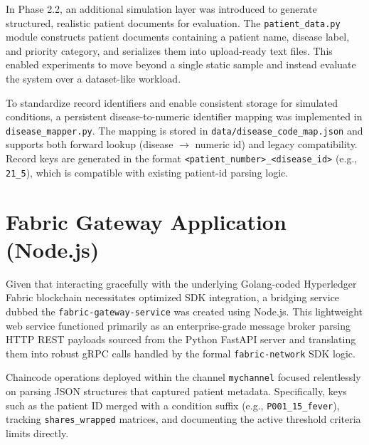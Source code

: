 In Phase 2.2, an additional simulation layer was introduced to generate structured, realistic patient documents for evaluation. The \texttt{patient\_data.py} module constructs patient documents containing a patient name, disease label, and priority category, and serializes them into upload-ready text files. This enabled experiments to move beyond a single static sample and instead evaluate the system over a dataset-like workload.

To standardize record identifiers and enable consistent storage for simulated conditions, a persistent disease-to-numeric identifier mapping was implemented in \texttt{disease\_mapper.py}. The mapping is stored in \texttt{data/disease\_code\_map.json} and supports both forward lookup (disease $\rightarrow$ numeric id) and legacy compatibility. Record keys are generated in the format \texttt{<patient\_number>\_<disease\_id>} (e.g., \texttt{21\_5}), which is compatible with existing patient-id parsing logic.

\section{Fabric Gateway Application (Node.js)}
Given that interacting gracefully with the underlying Golang-coded Hyperledger Fabric blockchain necessitates optimized SDK integration, a bridging service dubbed the \texttt{fabric-gateway-service} was created using Node.js.
This lightweight web service functioned primarily as an enterprise-grade message broker parsing HTTP REST payloads sourced from the Python FastAPI server and translating them into robust gRPC calls handled by the formal \texttt{fabric-network} SDK logic.

Chaincode operations deployed within the channel \texttt{mychannel} focused relentlessly on parsing JSON structures that captured patient metadata. Specifically, keys such as the patient ID merged with a condition suffix (e.g., \texttt{P001\_15\_fever}), tracking \texttt{shares\_wrapped} matrices, and documenting the active threshold criteria limits directly.

